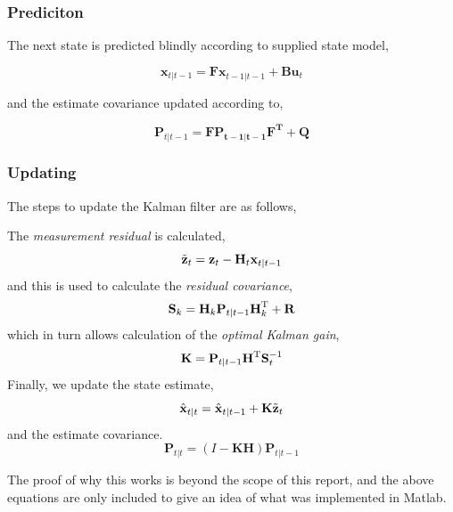\subsubsection{Prediciton}
The next state is predicted blindly according to supplied state model,

\begin{equation}
\mathbf{x}_{t|t-1} = \mathbf{Fx}_{t-1|t-1} + \mathbf{Bu}_{t}
\end{equation}

and the estimate covariance updated according to,

\begin{equation}
\mathbf{P}_{t|t-1} = \mathbf{FP_{t-1|t-1}F^{T}} + \mathbf{Q}
\end{equation}

\subsubsection{Updating}

The steps to update the Kalman filter are as follows,

The \emph{measurement residual} is calculated,
\begin{equation*}
\tilde{\textbf{z}}_t = \textbf{z}_t - \textbf{H}_t\textbf{x}_{t|t-1}\\
\end{equation*}
and this is used to calculate the \emph{residual covariance},
\begin{equation*}
\textbf{S}_k = \textbf{H}_k \textbf{P}_{t|t-1} \textbf{H}_k^\text{T} + \textbf{R}\\
\end{equation*}
which in turn allows calculation of the \emph{optimal Kalman gain},
\begin{equation*}
\textbf{K} = \textbf{P}_{t|t-1}\textbf{H}^\text{T}\textbf{S}_t^{-1}\\
\end{equation*}
Finally, we update the state estimate,
\begin{equation*}
\hat{\textbf{x}}_{t|t} = \hat{\textbf{x}}_{t|t-1} + \textbf{K}\tilde{\textbf{z}}_t\\
\end{equation*}
and the estimate covariance.
\begin{equation*}
\textbf{P}_{t|t} = (I - \textbf{K} \textbf{H}) \textbf{P}_{t|t-1}
\end{equation*}

The proof of why this works is beyond the scope of this report, and the above
equations are only included to give an idea of what was implemented in Matlab.


